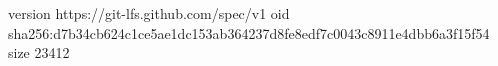 version https://git-lfs.github.com/spec/v1
oid sha256:d7b34cb624c1ce5ae1dc153ab364237d8fe8edf7c0043c8911e4dbb6a3f15f54
size 23412

